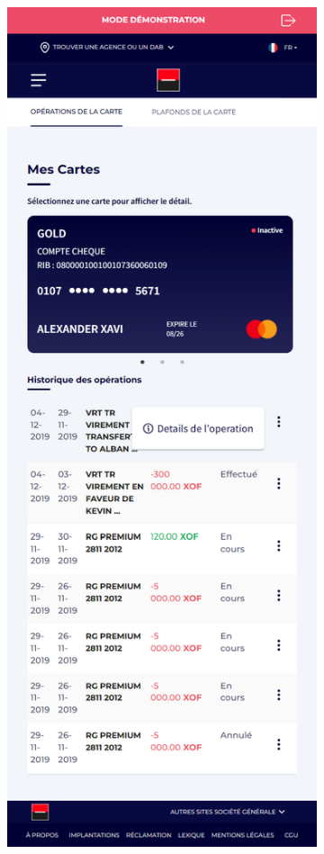 \begin{figure}[!ht]
    \centering
    \begin{subfigure}[b]{0.49\textwidth}
        \centering
        \includegraphics[width=\textwidth]{images/screens/cartes/mob-button.png}

\end{subfigure}
\end{figure}
